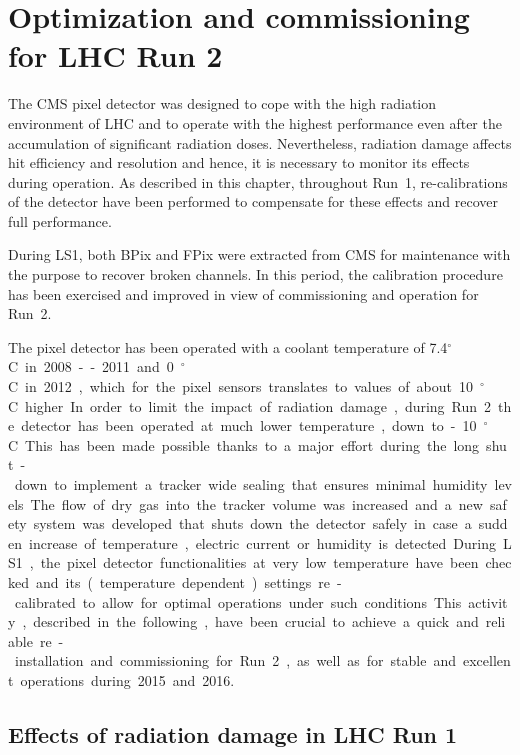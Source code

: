 \chapter{Optimization and commissioning for LHC Run 2}\label{ch:BPixCalib}

The CMS pixel detector was designed to cope with the high radiation environment of LHC and to operate with the highest performance even after the accumulation of significant radiation doses.
Nevertheless, radiation damage affects hit efficiency and resolution and hence, it is necessary to monitor its effects during operation.
As described in this chapter, throughout Run~1, re-calibrations of the detector have been performed to compensate for these effects and recover full performance.

During LS1, both BPix and FPix were extracted from CMS for maintenance with the purpose to recover broken channels.
In this period, the calibration procedure has been exercised and improved in view of commissioning and operation for Run~2.

The pixel detector has been operated with a coolant temperature of 7.4\unit{$^\circ$C} in 2008--2011 and 0\unit{$^\circ$C} in 2012, which for the pixel sensors translates to values of about 10\unit{$^\circ$C} higher.
In order to limit the impact of radiation damage, during Run~2 the detector has been operated at much lower temperature, down to -10\unit{$^\circ$C}.
This has been made possible thanks to a major effort during the long shut-down to implement a tracker wide sealing that ensures minimal humidity levels.
The flow of dry gas into the tracker volume was increased and a new safety system was developed that shuts down the detector safely in case a sudden increase of temperature, electric current or humidity is detected. 
During LS1, the pixel detector functionalities at very low temperature have been checked and its (temperature dependent) settings re-calibrated to allow for optimal operations under such conditions.
This activity, described in the following, have been crucial to achieve a quick and reliable re-installation and commissioning for Run~2, as well as for stable and excellent operations during 2015 and 2016.

\section{Effects of radiation damage in LHC Run 1}

